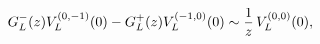 \begin{equation}
G_L^-(z)V_L^{(0,-1)}(0)-G_L^+(z)V_L^{(-1,0)}(0)\sim
{1\over z}\,V_L^{(0,0)}(0),
\end{equation}

